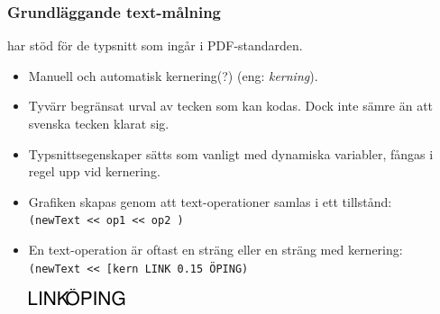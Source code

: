 \documentclass[noamsthm,handout]{beamer}
\newcommand{\inEnglish}[1]{(eng: \emph{#1})}
\begin{document}
\begin{frame}\frametitle{Grundläggande text-målning}
  \Shapes har stöd för de typsnitt som ingår i PDF-standarden.
  \begin{itemize}
  \item Manuell och automatisk kernering(?) \inEnglish{kerning}.
  \item Tyvärr begränsat urval av tecken som kan kodas.  Dock inte sämre än att svenska tecken klarat sig.
  \item Typsnittsegenskaper sätts som vanligt med dynamiska variabler, fångas i regel upp vid kernering.
  \item Grafiken skapas genom att text-operationer samlas i ett tillstånd:\\
    \texttt{({\color{red}newText} <{}< op1 <{}< op2 )}
  \item En text-operation är oftast en sträng eller en sträng med kernering:\\
    \texttt{({\color{red}newText} <{}< [kern \textasciigrave{}LINK\textasciiacute{} 0.15 \textasciigrave{}ÖPING\textasciiacute{})}\\
    \begin{center}
      \includegraphics{figures/linkoping}
    \end{center}
  \end{itemize}
\end{frame}
\end{document}
